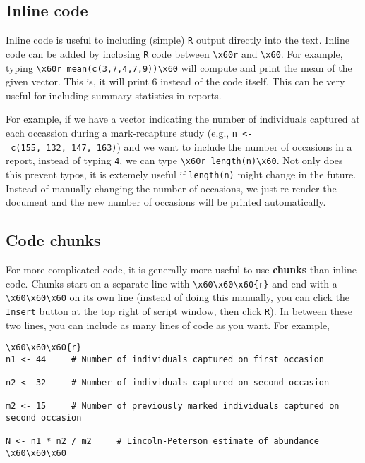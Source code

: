 \documentclass[]{article}
\begin{document}
\hypertarget{inline-code}{%
\subsection{Inline code}\label{inline-code}}

Inline code is useful to including (simple) \texttt{R} output directly
into the text. Inline code can be added by inclosing \texttt{R} code
between \texttt{\textbackslash{}x60r} and \texttt{\textbackslash{}x60}.
For example, typing
\texttt{\textbackslash{}x60r\ mean(c(3,7,4,7,9))\textbackslash{}x60}
will compute and print the mean of the given vector. This is, it will
print 6 instead of the code itself. This can be very useful for
including summary statistics in reports.

For example, if we have a vector indicating the number of individuals
captured at each occassion during a mark-recapture study (e.g.,
\texttt{n\ \textless{}-\ c(155,\ 132,\ 147,\ 163)}) and we want to
include the number of occasions in a report, instead of typing
\texttt{4}, we can type
\texttt{\textbackslash{}x60r\ length(n)\textbackslash{}x60}. Not only
does this prevent typos, it is extemely useful if \texttt{length(n)}
might change in the future. Instead of manually changing the number of
occasions, we just re-render the document and the new number of
occasions will be printed automatically.

\hypertarget{code-chunks}{%
\subsection{Code chunks}\label{code-chunks}}

For more complicated code, it is generally more useful to use
\textbf{chunks} than inline code. Chunks start on a separate line with
\texttt{\textbackslash{}x60\textbackslash{}x60\textbackslash{}x60\{r\}}
and end with a
\texttt{\textbackslash{}x60\textbackslash{}x60\textbackslash{}x60} on
its own line (instead of doing this manually, you can click the
\texttt{Insert} button at the top right of script window, then click
\texttt{R}). In between these two lines, you can include as many lines
of code as you want. For example,

\begin{verbatim}
\x60\x60\x60{r}
n1 <- 44     # Number of individuals captured on first occasion

n2 <- 32     # Number of individuals captured on second occasion
  
m2 <- 15     # Number of previously marked individuals captured on second occasion

N <- n1 * n2 / m2     # Lincoln-Peterson estimate of abundance 
\x60\x60\x60
\end{verbatim}
\end{document}
